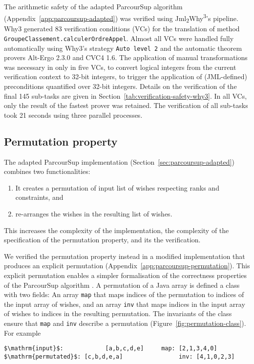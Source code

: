 \documentclass[a4paper]{report}
\newcommand{\cref}[1]{Section~\ref{#1}}
\newcommand{\aref}[1]{Appendix~\ref{#1}}
\newcommand{\jmlwhy}{\texorpdfstring{Jml\textsubscript{2}Why\textsuperscript{3}}{Jml2Why3}}
\begin{document}
The arithmetic safety of the adapted ParcourSup algorithm
(\aref{app:parcoursup-adapted}) was verified using \jmlwhy's pipeline. Why3
generated 83 verification conditions (VCs) for the translation of method
\lstinline{GroupeClassement.calculerOrdreAppel}. Almost all VCs were handled
fully automatically using Why3's strategy \lstinline{Auto level 2} and the
automatic theorem provers Alt-Ergo 2.3.0 and CVC4 1.6. The application of manual
transformations was necessary in only in five VCs, to convert logical integers
from the current verification context to 32-bit integers, to trigger the
application of (JML-defined) preconditions quantified over 32-bit integers.
Details on the verification of the final 145 sub-tasks are given in
\cref{tab:verification-safety-why3}. In all VCs, only the result of the fastest
prover was retained. The verification of all sub-tasks took 21 seconds using
three parallel processes.

\subsection{Permutation property}
\label{sec:parcoursup-permutation}

The adapted ParcourSup implementation (\cref{sec:parcoursup-adapted}) combines
two functionalities:
\begin{enumerate}
\item It creates a permutation of input list of wishes respecting ranks and
  constraints, and
\item re-arranges the wishes in the resulting list of wishes.
\end{enumerate}
This increases the complexity of the implementation, the complexity of the
specification of the permutation property, and its the verification.

We verified the permutation property instead in a modified implementation that
produces an explicit permutation (\aref{app:parcoursup-permutation}). This
explicit permutation enables a simpler formalisation of the correctness
properties of the ParcourSup algorithm \cite{parcoursup-specifications}. A
permutation of a Java array is defined a class with two fields: An array
\lstinline{map} that maps indices of the permutation to indices of the input
array of wishes, and an array \lstinline{inv} that maps indices in the input
array of wishes to indices in the resulting permutation. The invariants of the
class ensure that \lstinline{map} and \lstinline{inv} describe a permutation
(Figure~\ref{fig:permutation-class}). For example
\begin{lstlisting}
$\mathrm{input}$:            [a,b,c,d,e]     map: [2,1,3,4,0]
$\mathrm{permutated}$: [c,b,d,e,a]                inv: [4,1,0,2,3]
\end{lstlisting}
\end{document}
